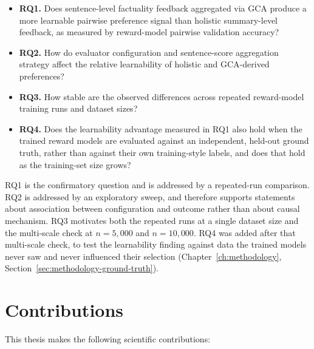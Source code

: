 \begin{itemize}
  \item \textbf{RQ1.} Does sentence-level factuality feedback aggregated via GCA
    produce a more learnable pairwise preference signal than holistic
    summary-level feedback, as measured by reward-model pairwise validation
    accuracy?

  \item \textbf{RQ2.} How do evaluator configuration and sentence-score
    aggregation strategy affect the relative learnability of holistic and
    GCA-derived preferences?

  \item \textbf{RQ3.} How stable are the observed differences across repeated
    reward-model training runs and dataset sizes?

  \item \textbf{RQ4.} Does the learnability advantage measured in RQ1 also hold
    when the trained reward models are evaluated against an independent,
    held-out ground truth, rather than against their own training-style
    labels, and does that hold as the training-set size grows?
\end{itemize}

RQ1 is the confirmatory question and is addressed by a repeated-run comparison.
RQ2 is addressed by an exploratory sweep, and therefore supports statements about
association between configuration and outcome rather than about causal mechanism.
RQ3 motivates both the repeated runs at a single dataset size and the
multi-scale check at $n=5{,}000$ and $n=10{,}000$. RQ4 was added after that
multi-scale check, to test the learnability finding against data the trained
models never saw and never influenced their selection
(Chapter~\ref{ch:methodology}, Section~\ref{sec:methodology-ground-truth}).

\section{Contributions}
\label{sec:intro-contributions}

This thesis makes the following scientific contributions:

